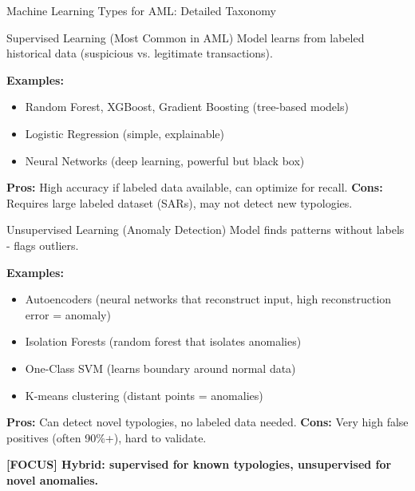 \documentclass[11pt,a4paper]{beamer}
\newcommand{\examfocus}[1]{\textcolor{orange!80!black}{\textbf{[FOCUS] #1}}}
\begin{document}
\begin{frame}{Machine Learning Types for AML: Detailed Taxonomy}
	\begin{block}{Supervised Learning (Most Common in AML)}
		Model learns from labeled historical data (suspicious vs. legitimate transactions).
	\end{block}
	\textbf{Examples:}
	\begin{itemize}
		\item Random Forest, XGBoost, Gradient Boosting (tree-based models)
		\item Logistic Regression (simple, explainable)
		\item Neural Networks (deep learning, powerful but black box)
	\end{itemize}
	\textbf{Pros:} High accuracy if labeled data available, can optimize for recall. \textbf{Cons:} Requires large labeled dataset (SARs), may not detect new typologies.
	
	\begin{block}{Unsupervised Learning (Anomaly Detection)}
		Model finds patterns without labels - flags outliers.
	\end{block}
	\textbf{Examples:}
	\begin{itemize}
		\item Autoencoders (neural networks that reconstruct input, high reconstruction error = anomaly)
		\item Isolation Forests (random forest that isolates anomalies)
		\item One-Class SVM (learns boundary around normal data)
		\item K-means clustering (distant points = anomalies)
	\end{itemize}
	\textbf{Pros:} Can detect novel typologies, no labeled data needed. \textbf{Cons:} Very high false positives (often 90\%+), hard to validate.
	
	\examfocus{Hybrid: supervised for known typologies, unsupervised for novel anomalies.}
\end{frame}
\end{document}
